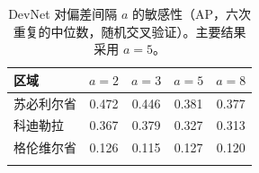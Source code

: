 \documentclass[pdflatex,sn-apa]{sn-jnl}
\begin{document}
\begin{appendices}
\begin{table}[!h]
\caption{DevNet 对偏差间隔 $a$ 的敏感性（AP，六次重复的中位数，随机交叉验证）。主要结果采用 $a = 5$。}\label{tab:margin}
\footnotesize
\begin{tabular*}{0.7\textwidth}{@{\extracolsep\fill}lcccc}
\toprule
区域 & $a = 2$ & $a = 3$ & $a = 5$ & $a = 8$ \\
\midrule
苏必利尔省 & 0.472 & 0.446 & 0.381 & 0.377 \\
科迪勒拉 & 0.367 & 0.379 & 0.327 & 0.313 \\
格伦维尔省 & 0.126 & 0.115 & 0.127 & 0.120 \\
\botrule
\end{tabular*}
\end{table}

\end{appendices}

\clearpage


\end{document}
